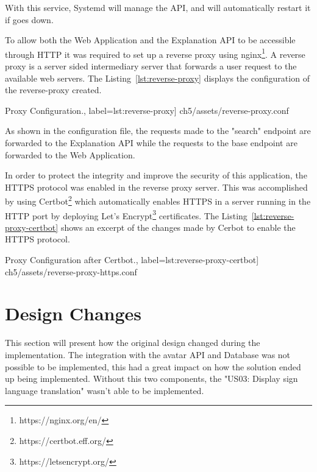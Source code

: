 With this service, Systemd will manage the API, and will automatically restart it if goes down.

To allow both the Web Application and the Explanation API to be accessible through HTTP it was required to set up a reverse proxy using nginx\footnote{https://nginx.org/en/}.
A reverse proxy is a server sided intermediary server that forwards a user request to the available web servers.
The Listing~\ref{lst:reverse-proxy} displays the configuration of the reverse-proxy created.

\begin{center}
\begin{minipage}{0.95\linewidth}
 Proxy Configuration.,
label=lst:reverse-proxy]
{ch5/assets/reverse-proxy.conf}
\end{minipage}
\end{center}

As shown in the configuration file, the requests made to the "search" endpoint are forwarded to the Explanation API while the requests to the base endpoint are forwarded to the Web Application.

In order to protect the integrity and improve the security of this application, the HTTPS protocol was enabled in the reverse proxy server.
This was accomplished by using Certbot\footnote{https://certbot.eff.org/} which automatically enables HTTPS in a server running in the HTTP port by deploying Let's Encrypt\footnote{https://letsencrypt.org/} certificates.
The Listing~\ref{lst:reverse-proxy-certbot} shows an excerpt of the changes made by Cerbot to enable the HTTPS protocol.

\begin{center}
\begin{minipage}{0.95\linewidth}
 Proxy Configuration after Certbot.,
label=lst:reverse-proxy-certbot]
{ch5/assets/reverse-proxy-https.conf}
\end{minipage}
\end{center}

\section{Design Changes}

This section will present how the original design changed during the implementation.
The integration with the avatar API and Database was not possible to be implemented, this had a great impact on how the solution ended up being implemented.
Without this two components, the "US03: Display sign language translation" wasn't able to be implemented.

